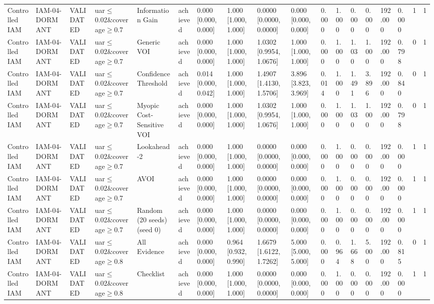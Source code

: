 \begin{table}[!ht]
{\begin{tabular}{llllllllllllllllll}
Controlled IAM & IAM-04-DORMANT & VALIDATED & uar$\le$0.02\&coverage$\ge$0.7 & Information Gain & achieved & 0.000 [0.000, 0.000] & 1.000 [1.000, 1.000] & 0.0000 [0.0000, 0.0000] & 0.000 [0.000, 0.000] & 0.000 & 1.000 & 0.000 & 0.000 & 192.000 & 0.000 & 1 & 1 \\
Controlled IAM & IAM-04-DORMANT & VALIDATED & uar$\le$0.02\&coverage$\ge$0.7 & Generic VOI & achieved & 0.000 [0.000, 0.000] & 1.000 [1.000, 1.000] & 1.0302 [0.9954, 1.0676] & 1.000 [1.000, 1.000] & 0.000 & 1.000 & 1.030 & 1.000 & 192.000 & 0.798 & 0 & 1 \\
Controlled IAM & IAM-04-DORMANT & VALIDATED & uar$\le$0.02\&coverage$\ge$0.7 & Confidence Threshold & achieved & 0.014 [0.000, 0.042] & 1.000 [1.000, 1.000] & 1.4907 [1.4130, 1.5706] & 3.896 [3.823, 3.969] & 0.014 & 1.000 & 1.491 & 3.896 & 192.000 & 0.840 & 0 & 1 \\
Controlled IAM & IAM-04-DORMANT & VALIDATED & uar$\le$0.02\&coverage$\ge$0.7 & Myopic Cost-Sensitive VOI & achieved & 0.000 [0.000, 0.000] & 1.000 [1.000, 1.000] & 1.0302 [0.9954, 1.0676] & 1.000 [1.000, 1.000] & 0.000 & 1.000 & 1.030 & 1.000 & 192.000 & 0.798 & 0 & 1 \\
Controlled IAM & IAM-04-DORMANT & VALIDATED & uar$\le$0.02\&coverage$\ge$0.7 & Lookahead-2 & achieved & 0.000 [0.000, 0.000] & 1.000 [1.000, 1.000] & 0.0000 [0.0000, 0.0000] & 0.000 [0.000, 0.000] & 0.000 & 1.000 & 0.000 & 0.000 & 192.000 & 0.000 & 1 & 1 \\
Controlled IAM & IAM-04-DORMANT & VALIDATED & uar$\le$0.02\&coverage$\ge$0.7 & AVOI & achieved & 0.000 [0.000, 0.000] & 1.000 [1.000, 1.000] & 0.0000 [0.0000, 0.0000] & 0.000 [0.000, 0.000] & 0.000 & 1.000 & 0.000 & 0.000 & 192.000 & 0.000 & 1 & 1 \\
Controlled IAM & IAM-04-DORMANT & VALIDATED & uar$\le$0.02\&coverage$\ge$0.7 & Random (20 seeds) (seed 0) & achieved & 0.000 [0.000, 0.000] & 1.000 [1.000, 1.000] & 0.0000 [0.0000, 0.0000] & 0.000 [0.000, 0.000] & 0.000 & 1.000 & 0.000 & 0.000 & 192.000 & 0.000 & 1 & 1 \\
Controlled IAM & IAM-04-DORMANT & VALIDATED & uar$\le$0.02\&coverage$\ge$0.8 & All Evidence & achieved & 0.000 [0.000, 0.000] & 0.964 [0.932, 0.990] & 1.6679 [1.6122, 1.7262] & 5.000 [5.000, 5.000] & 0.000 & 0.964 & 1.668 & 5.000 & 192.000 & 0.815 & 0 & 1 \\
Controlled IAM & IAM-04-DORMANT & VALIDATED & uar$\le$0.02\&coverage$\ge$0.8 & Checklist & achieved & 0.000 [0.000, 0.000] & 1.000 [1.000, 1.000] & 0.0000 [0.0000, 0.0000] & 0.000 [0.000, 0.000] & 0.000 & 1.000 & 0.000 & 0.000 & 192.000 & 0.000 & 1 & 1 \\

\end{tabular}}
\end{table}
